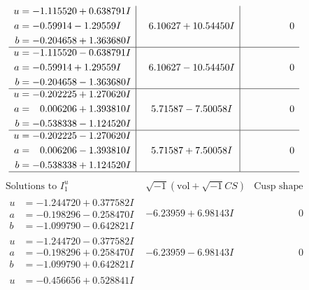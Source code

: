 \documentclass[1p]{elsarticle_modified}
\theoremstyle{definition}
\newcommand{\I}{\sqrt{-1}}
\begin{document}
$$\begin{array}{c|c|c}
\begin{aligned}
u &= -1.115520 + 0.638791 I \\
a &= -0.59914 - 1.29559 I \\
b &= -0.204658 + 1.363680 I\end{aligned}
 & \phantom{-}6.10627 + 10.54450 I & \phantom{-0.000000 } 0 \\ \hline\begin{aligned}
u &= -1.115520 - 0.638791 I \\
a &= -0.59914 + 1.29559 I \\
b &= -0.204658 - 1.363680 I\end{aligned}
 & \phantom{-}6.10627 - 10.54450 I & \phantom{-0.000000 } 0 \\ \hline\begin{aligned}
u &= -0.202225 + 1.270620 I \\
a &= \phantom{-}0.006206 + 1.393810 I \\
b &= -0.538338 - 1.124520 I\end{aligned}
 & \phantom{-}5.71587 - 7.50058 I & \phantom{-0.000000 } 0 \\ \hline\begin{aligned}
u &= -0.202225 - 1.270620 I \\
a &= \phantom{-}0.006206 - 1.393810 I \\
b &= -0.538338 + 1.124520 I\end{aligned}
 & \phantom{-}5.71587 + 7.50058 I & \phantom{-0.000000 } 0\\
 \hline 
 \end{array}$$\newpage$$\begin{array}{c|c|c}  
\text{Solutions to }I^u_{1}& \I (\text{vol} + \sqrt{-1}CS) & \text{Cusp shape}\\
 \hline 
\begin{aligned}
u &= -1.244720 + 0.377582 I \\
a &= -0.198296 - 0.258470 I \\
b &= -1.099790 - 0.642821 I\end{aligned}
 & -6.23959 + 6.98143 I & \phantom{-0.000000 } 0 \\ \hline\begin{aligned}
u &= -1.244720 - 0.377582 I \\
a &= -0.198296 + 0.258470 I \\
b &= -1.099790 + 0.642821 I\end{aligned}
 & -6.23959 - 6.98143 I & \phantom{-0.000000 } 0 \\ \hline\begin{aligned}
u &= -0.456656 + 0.528841 I \\

\end{aligned}
\end{array}$$
\end{document}
